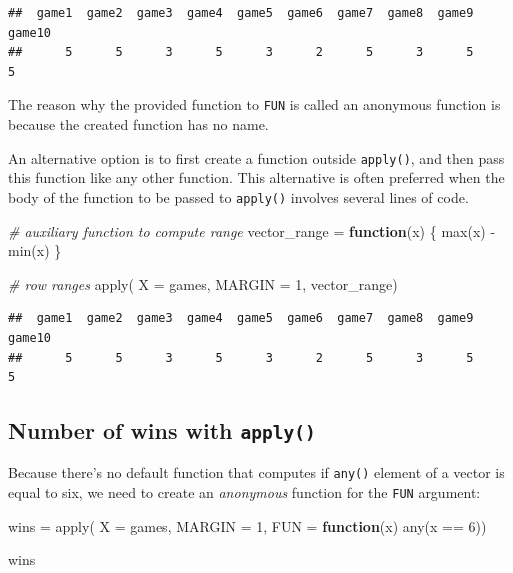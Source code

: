 \documentclass[
]{book}
\newenvironment{Shaded}{\begin{snugshade}}{\end{snugshade}}
\newcommand{\AttributeTok}[1]{\textcolor[rgb]{0.77,0.63,0.00}{#1}}
\newcommand{\CommentTok}[1]{\textcolor[rgb]{0.56,0.35,0.01}{\textit{#1}}}
\newcommand{\ControlFlowTok}[1]{\textcolor[rgb]{0.13,0.29,0.53}{\textbf{#1}}}
\newcommand{\DecValTok}[1]{\textcolor[rgb]{0.00,0.00,0.81}{#1}}
\newcommand{\FunctionTok}[1]{\textcolor[rgb]{0.00,0.00,0.00}{#1}}
\newcommand{\NormalTok}[1]{#1}
\newcommand{\OtherTok}[1]{\textcolor[rgb]{0.56,0.35,0.01}{#1}}
\newcommand{\SpecialCharTok}[1]{\textcolor[rgb]{0.00,0.00,0.00}{#1}}
\begin{document}
\begin{verbatim}
##  game1  game2  game3  game4  game5  game6  game7  game8  game9 game10 
##      5      5      3      5      3      2      5      3      5      5
\end{verbatim}

The reason why the provided function to \texttt{FUN} is called an anonymous function
is because the created function has no name.

An alternative option is to first create a function outside \texttt{apply()}, and
then pass this function like any other function. This alternative is often
preferred when the body of the function to be passed to \texttt{apply()} involves
several lines of code.

\begin{Shaded}
\begin{Highlighting}[]
\CommentTok{\# auxiliary function to compute range}
\NormalTok{vector\_range }\OtherTok{=} \ControlFlowTok{function}\NormalTok{(x) \{}
  \FunctionTok{max}\NormalTok{(x) }\SpecialCharTok{{-}} \FunctionTok{min}\NormalTok{(x)}
\NormalTok{\}}

\CommentTok{\# row ranges}
\FunctionTok{apply}\NormalTok{(}
  \AttributeTok{X =}\NormalTok{ games, }
  \AttributeTok{MARGIN =} \DecValTok{1}\NormalTok{, }
\NormalTok{  vector\_range)}
\end{Highlighting}
\end{Shaded}

\begin{verbatim}
##  game1  game2  game3  game4  game5  game6  game7  game8  game9 game10 
##      5      5      3      5      3      2      5      3      5      5
\end{verbatim}

\hypertarget{number-of-wins-with-apply}{%
\subsection{\texorpdfstring{Number of wins with \texttt{apply()}}{Number of wins with apply()}}\label{number-of-wins-with-apply}}

Because there's no default function that computes if \texttt{any()} element of a
vector is equal to six, we need to create an \emph{anonymous} function for the
\texttt{FUN} argument:

\begin{Shaded}
\begin{Highlighting}[]
\NormalTok{wins }\OtherTok{=} \FunctionTok{apply}\NormalTok{(}
  \AttributeTok{X =}\NormalTok{ games, }
  \AttributeTok{MARGIN =} \DecValTok{1}\NormalTok{,}
  \AttributeTok{FUN =} \ControlFlowTok{function}\NormalTok{(x) }\FunctionTok{any}\NormalTok{(x }\SpecialCharTok{==} \DecValTok{6}\NormalTok{))}

\NormalTok{wins}
\end{Highlighting}
\end{Shaded}
\end{document}
